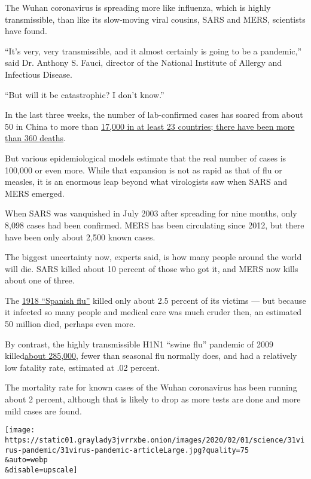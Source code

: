 The Wuhan coronavirus is spreading more like influenza, which is highly
transmissible, than like its slow-moving viral cousins, SARS and MERS,
scientists have found.

``It's very, very transmissible, and it almost certainly is going to be
a pandemic,'' said Dr. Anthony S. Fauci, director of the National
Institute of Allergy and Infectious Disease.

``But will it be catastrophic? I don't know.''

In the last three weeks, the number of lab-confirmed cases has soared
from about 50 in China to more than
\href{https://www.nytimes3xbfgragh.onion/2020/02/02/world/asia/china-coronavirus.html}{17,000
in at least 23 countries; there have been more than 360 deaths}.

But various epidemiological models estimate that the real number of
cases is 100,000 or even more. While that expansion is not as rapid as
that of flu or measles, it is an enormous leap beyond what virologists
saw when SARS and MERS emerged.

When SARS was vanquished in July 2003 after spreading for nine months,
only 8,098 cases had been confirmed. MERS has been circulating since
2012, but there have been only about 2,500 known cases.

The biggest uncertainty now, experts said, is how many people around the
world will die. SARS killed about 10 percent of those who got it, and
MERS now kills about one of three.

The \href{https://wwwnc.cdc.gov/eid/article/12/1/05-0979_article}{1918
``Spanish flu''} killed only about 2.5 percent of its victims --- but
because it infected so many people and medical care was much cruder
then, an estimated 50 million died, perhaps even more.

By contrast, the highly transmissible H1N1 ``swine flu'' pandemic of
2009
killed\href{https://www.thelancet.com/journals/laninf/article/PIIS1473-3099(12)70121-4/fulltext}{about
285,000}, fewer than seasonal flu normally does, and had a relatively
low fatality rate, estimated at .02 percent.

The mortality rate for known cases of the Wuhan coronavirus has been
running about 2 percent, although that is likely to drop as more tests
are done and more mild cases are found.

\texttt{[image: https://static01.graylady3jvrrxbe.onion/images/2020/02/01/science/31virus-pandemic/31virus-pandemic-articleLarge.jpg?quality=75\\\&auto=webp\\\&disable=upscale]}

